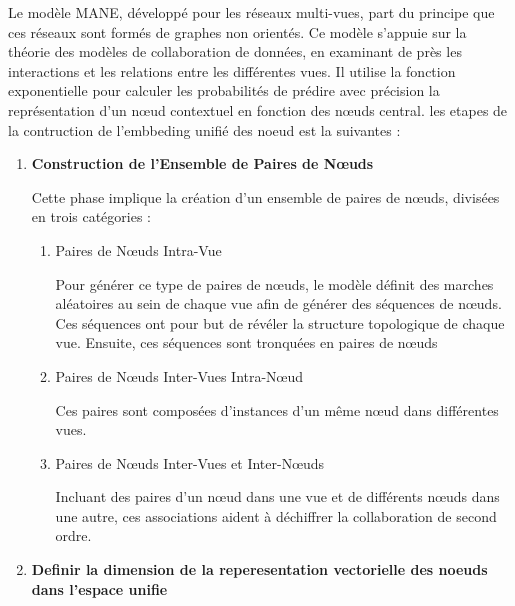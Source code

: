         Le modèle MANE, développé pour les réseaux multi-vues, part du principe que ces réseaux sont formés de graphes non orientés. Ce modèle s'appuie sur la théorie des modèles de collaboration de données, en examinant de près les interactions et les relations entre les différentes vues. Il utilise la fonction exponentielle pour calculer les probabilités de prédire avec précision la représentation d'un nœud contextuel en fonction des  nœuds central. les etapes de la contruction de l'embbeding unifié des noeud est la suivantes : 
       \begin{enumerate}
        
             \item\textbf {Construction de l'Ensemble de Paires de Nœuds }
                
                Cette phase implique la création d'un ensemble de paires de nœuds, divisées en trois catégories :
                \begin{enumerate}
                    \item {Paires de Nœuds Intra-Vue}
                    
                   Pour générer ce type de paires de nœuds, le modèle définit des marches aléatoires au sein de chaque vue afin de générer des séquences de nœuds. Ces séquences ont pour but de révéler la structure topologique de chaque vue. Ensuite, ces séquences sont tronquées en paires de nœuds
                    \item {Paires de Nœuds Inter-Vues Intra-Nœud}
                    
                    Ces paires sont composées d'instances d'un même nœud dans différentes vues.
                    
                    \item {Paires de Nœuds Inter-Vues et Inter-Nœuds}
                    
                    Incluant des paires d'un nœud dans une vue et de différents nœuds dans une autre, ces associations aident à déchiffrer la collaboration de second ordre.   
                \end{enumerate}
                
             \item\textbf{Definir la dimension de la reperesentation vectorielle des noeuds  dans l'espace unifie}
                    

\end{enumerate}
